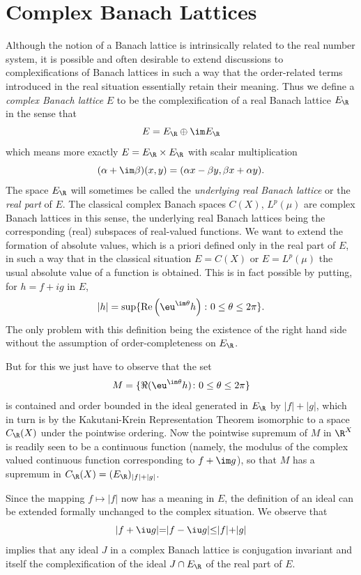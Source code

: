 \section{Complex Banach Lattices}\label{sec:c1-7}%
Although the notion of a Banach lattice is intrinsically related to the real number system, it is possible and often desirable to extend discussions to complexifications of Banach lattices in such a way that the order-related terms introduced in the real situation essentially retain their meaning.
Thus we define a \emph{complex Banach lattice} $ E $ to be the complexification of a real Banach lattice $ E_{\R} $ in the sense that
\[
E = E_{\R} \oplus \im E_{\R}
\]
which means more exactly $ E = E_{\R} \times E_{\R} $ with scalar multiplication 
%
\[
	 (\alpha+\im\beta)(x,y) = (\alpha x-\beta y,\beta x+\alpha y)  .
\]
%
The space $ E_{\R} $ will sometimes be called the \emph{underlying real Banach lattice} or the \emph{real part} of\/ $ E $.
The classical complex Banach spaces $ C(X) $, $ L^{p}(\mu) $ are complex Banach lattices in this sense, the underlying real Banach lattices being the corresponding (real) subspaces of real-valued functions.
We want to extend the formation of absolute values, which is a priori defined only in the real part of\/ $ E $, in such a way that in the classical situation $ E = C(X) $ or $ E = L^{p}(\mu) $ the usual absolute value of a function is obtained.
This is in fact possible by putting, for $ h = f + ig $ in $ E $,
\[
	|h| = \sup\{ \mathrm{Re} \left(  \eu^{\im\theta}h \right) \colon 0 \leq \theta \leq 2\pi \}.
\]
The only problem with this definition being the existence of the right hand side without the assumption of order-completeness on $ E_{\R} $.

But for this we just have to observe that the set 
\[
M = \{\Re( \eu^{\im\theta}h) \colon 0 \leq \theta \leq 2\pi\}
\]
is contained and order bounded in the ideal generated in $ E_{\R} $ by $ |f| + |g| $, which in turn is by the Kakutani-Krein Representation Theorem isomorphic to a space $ C_{\R}(X) $ under the pointwise ordering.
Now the pointwise supremum of\/ $ M $ in $ \R^{X} $ is readily seen to be a continuous function (namely, the modulus of the complex valued continuous function corresponding to $ f + \im g $), so that $ M $ has a supremum in $ C_{\R}(X) = (E_{\R})_{|f|+|g|} $.

Since the mapping $ f \mapsto |f| $ now has a meaning in $ E $, the definition of an ideal can be extended formally unchanged to the complex situation.
We observe that 
\[ 
    \rvert f + \iu g \lvert = \rvert f - \iu g \lvert 
        \leq \rvert f \lvert + \rvert g \lvert
\]
implies that any ideal $ J $ in a complex Banach lattice 
is conjugation invariant and itself the complexification of the ideal $ J \cap E_{\R} $ of the real part of\/ $ E $.

